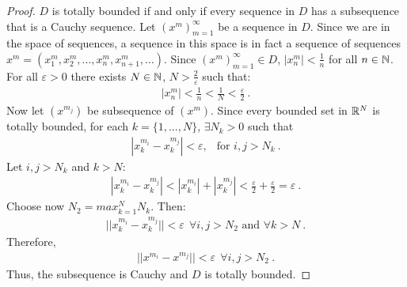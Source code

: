 \begin{questions}


\begin{solution}
  \begin{proof}
  $D$ is totally bounded if and only if every sequence in $D$ has a subsequence that is a Cauchy sequence.
  Let $(x^m)_{m=1}^\infty$ be a sequence in $D$. Since we are in the space of sequences, a sequence in this space is in fact a sequence of sequences $x^m=(x^m_1,x^m_2,...,x^m_n,x^m_{n+1},...)$. Since $(x^m)_{m=1}^\infty\in D$, $|x_n^m|<\frac{1}{n}$ for all $n\in\mathbb{N}$. For all $\varepsilon >0$ there exists $N\in\mathbb{N}$, $N>\frac{2}{\varepsilon}$ such that:
  \begin{align*}
  |x_n^m|<\frac{1}{n}<\frac{1}{N}<\frac{\varepsilon}{2}~.
  \end{align*}
  Now let $(x^{m_j})$ be subsequence of $(x^m)$. Since every bounded set in $\mathbb{R}^N$ is totally bounded, for each $k=\{1,...,N\}$, $\exists N_k>0$ such that
  \begin{align*}
  |x_k^{m_i}-x_k^{m_j}|<\varepsilon,~~\text{ for }i,j>N_k~. 
  \end{align*}
  Let $i,j>N_k$ and $k>N$:
  \begin{align*}
  |x_k^{m_i}-x_k^{m_j}|<|x_k^{m_i}|+|x_k^{m_j}|<\frac{\varepsilon}{2}+\frac{\varepsilon}{2}=\varepsilon~.
  \end{align*}
  Choose now $N_2=max_{k=1}^NN_k$. Then:
  \begin{align*}
  ||x_k^{m_i}-x_k^{m_j}||<\varepsilon~~\forall i,j>N_2\text{ and }\forall k>N~.
  \end{align*}
  Therefore,
  \begin{align*}
  ||x^{m_i}-x^{m_j}||<\varepsilon~~\forall i,j>N_2~.
  \end{align*}
  Thus, the subsequence is Cauchy and $D$ is totally bounded.
  \end{proof}
\end{solution}


\end{questions}